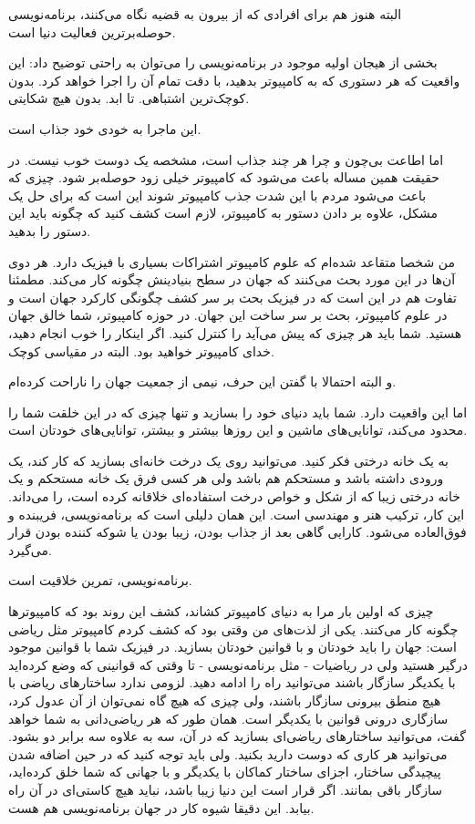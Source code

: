 البته هنوز هم برای افرادی که از بیرون به قضیه نگاه می‌کنند، برنامه‌نویسی
حوصله‌برترین فعالیت دنیا است.

بخشی از هیجان اولیه موجود در برنامه‌نویسی را می‌توان به راحتی توضیح داد:
این واقعیت که هر دستوری که به کامپیوتر بدهید، با دقت تمام آن را اجرا
خواهد کرد. بدون کوچک‌ترین اشتباهی. تا ابد. بدون هیچ شکایتی.

این ماجرا به خودی خود جذاب است. 

اما اطاعت بی‌چون و چرا هر چند جذاب است، مشخصه یک دوست خوب نیست. در
حقیقت همین مساله باعث می‌شود که کامپیوتر خیلی زود حوصله‌بر شود. چیزی که
باعث می‌شود مردم با این شدت جذب کامپیوتر شوند این است که برای حل یک
مشکل، علاوه بر دادن دستور به کامپیوتر، لازم است کشف کنید که چگونه باید
این دستور را بدهید.

من شخصا متقاعد شده‌ام که علوم کامپیوتر اشتراکات بسیاری با فیزیک
دارد. هر دوی آن‌ها در این مورد بحث می‌کنند که جهان در سطح بنیادینش چگونه
کار می‌کند. مطمئنا تفاوت هم در این است که در فیزیک بحث بر سر کشف چگونگی
کارکرد جهان است و در علوم کامپیوتر، بحث بر سر ساخت این جهان. در حوزه
کامپیوتر، شما خالق جهان هستید. شما باید هر چیزی که پیش می‌آید را کنترل
کنید. اگر اینکار را خوب انجام دهید، خدای کامپیوتر خواهید بود. البته در
مقیاسی کوچک.

و البته احتمالا با گفتن این حرف، نیمی از جمعیت جهان را ناراحت کرده‌ام.

اما این واقعیت دارد. شما باید دنیای خود را بسازید و تنها چیزی که در
این خلقت شما را محدود می‌کند، توانایی‌های ماشین و این روزها بیشتر و
بیشتر، توانایی‌های خودتان است.

\vspace*{20pt}

به یک خانه درختی فکر کنید. می‌توانید روی یک درخت خانه‌ای بسازید که کار
کند، یک ورودی داشته باشد و مستحکم هم باشد ولی هر کسی فرق یک خانه
مستحکم و یک خانه درختی زیبا که از شکل و خواص درخت استفاده‌ای خلاقانه
کرده است، را می‌داند. این کار،‌ ترکیب هنر و مهندسی‌ است. این همان دلیلی
است که برنامه‌نویسی، فریبنده و فوق‌العاده می‌شود. کارایی گاهی بعد از جذاب
بودن،‌ زیبا بودن یا شوکه کننده بودن قرار می‌گیرد.

برنامه‌نویسی، تمرین خلاقیت است. 

چیزی که اولین بار مرا به دنیای کامپیوتر کشاند، کشف این روند بود که
کامپیوترها چگونه کار می‌کنند. یکی از لذت‌های من وقتی بود که کشف کردم
کامپیوتر مثل ریاضی است: جهان را باید خودتان و با قوانین خودتان
بسازید. در فیزیک شما با قوانین موجود درگیر هستید ولی در ریاضیات - مثل
برنامه‌نویسی - تا وقتی که قوانینی که وضع کرده‌اید با یکدیگر سازگار باشند
می‌توانید راه را ادامه دهید. لزومی ندارد ساختارهای ریاضی با هیچ منطق
بیرونی سازگار باشند، ولی چیزی که هیچ گاه نمی‌توان از آن عدول کرد،
سازگاری درونی قوانین با یکدیگر است. همان طور که هر ریاضی‌دانی به شما
خواهد گفت، می‌توانید ساختارهای ریاضی‌ای بسازید که در آن، سه به علاوه سه
برابر دو بشود. می‌توانید هر کاری که دوست دارید بکنید. ولی باید توجه
کنید که در حین اضافه شدن پیچیدگی ساختار، اجزای ساختار کماکان با یکدیگر
و با جهانی که شما خلق کرده‌اید، سازگار باقی بمانند. اگر قرار است این
دنیا زیبا باشد، نباید هیچ کاستی‌ای در آن راه بیابد. این دقیقا شیوه کار
در جهان برنامه‌نویسی هم هست.

